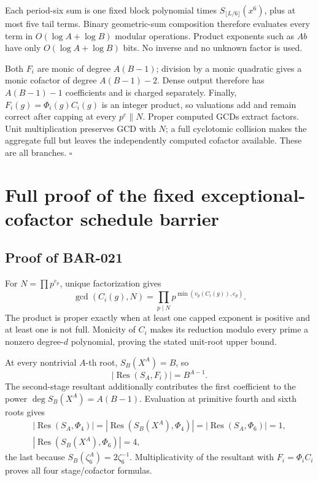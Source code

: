 \documentclass[11pt]{article}
\begin{document}
Each period-six sum is one fixed block polynomial times
\(S_{\lfloor L/6\rfloor}(x^6)\), plus at most five tail terms. Binary
geometric-sum composition therefore evaluates every term in
\(O(\log A+\log B)\) modular operations. Product exponents such as \(Ab\)
have only \(O(\log A+\log B)\) bits. No inverse and no unknown factor is
used.

Both \(F_i\) are monic of degree \(A(B-1)\); division by a monic quadratic
gives a monic cofactor of degree \(A(B-1)-2\). Dense output therefore has
\(A(B-1)-1\) coefficients and is charged separately. Finally,
\(F_i(g)=\Phi_i(g)C_i(g)\) is an integer product, so valuations add and
remain correct after capping at every \(p^e\parallel N\). Proper computed
GCDs extract factors. Unit multiplication preserves GCD with \(N\); a full
cyclotomic collision makes the aggregate full but leaves the independently
computed cofactor available. These are all branches. \(\square\)

\clearpage
\section{Full proof of the fixed exceptional-cofactor schedule barrier}

\subsection{Proof of BAR-021}\label{proof:BAR-021}

For \(N=\prod p^{e_p}\), unique factorization gives
\[
\gcd(C_i(g),N)=
\prod_{p\mid N}p^{\min(v_p(C_i(g)),e_p)}.
\]
The product is proper exactly when at least one capped exponent is positive
and at least one is not full. Monicity of \(C_i\) makes its reduction modulo
every prime a nonzero degree-\(d\) polynomial, proving the stated unit-root
upper bound.

At every nontrivial \(A\)-th root, \(S_B(X^A)=B\), so
\[
|\operatorname{Res}(S_A,F_i)|=B^{A-1}.
\]
The second-stage resultant additionally contributes the first coefficient to
the power \(\deg S_B(X^A)=A(B-1)\). Evaluation at primitive fourth and sixth
roots gives
\[
\begin{gathered}
|\operatorname{Res}(S_A,\Phi_4)|
=|\operatorname{Res}(S_B(X^A),\Phi_4)|
=|\operatorname{Res}(S_A,\Phi_6)|=1,\\
|\operatorname{Res}(S_B(X^A),\Phi_6)|=4,
\end{gathered}
\]
the last because \(S_B(\zeta_6^A)=2\zeta_6^{-1}\). Multiplicativity of the
resultant with \(F_i=\Phi_iC_i\) proves all four stage/cofactor formulas.
\end{document}
